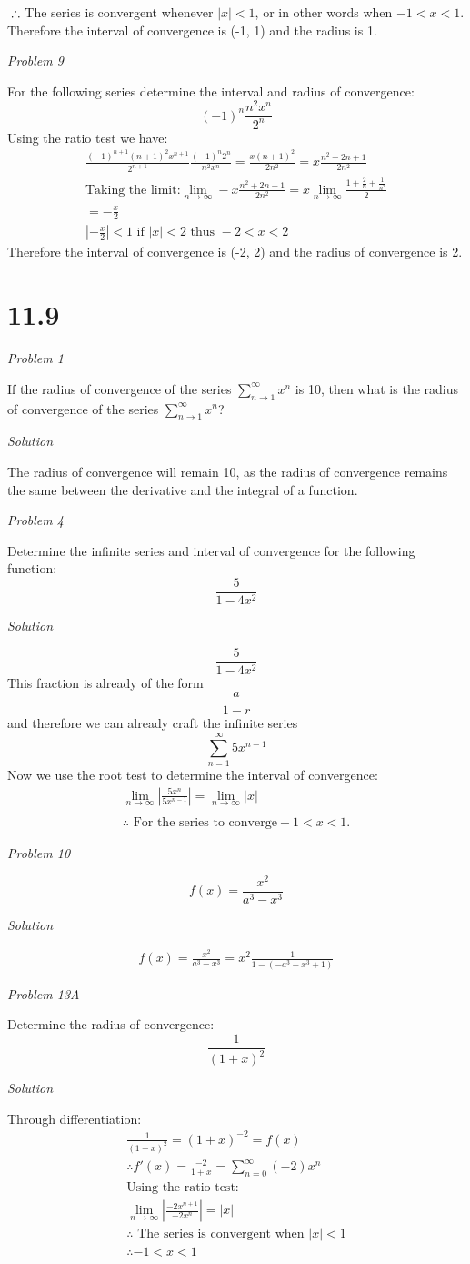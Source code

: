 \documentclass{article}
\newcommand{\qst}[1]{\newpage \begin{center}\textit{Problem #1}\end{center}}
\newcommand{\sol}{\begin{center}\textit{Solution}\end{center}}
\newcommand{\thf}{\\\therefore}
\begin{document}
$\thf$ The series is convergent whenever $|x|<1$, or in other words when $-1<x<1$. Therefore the interval of convergence is (-1, 1) and the radius is 1.
\qst{9}
For the following series determine the interval and radius of convergence:
$$(-1)^n\frac{n^2x^n}{2^n}$$
Using the ratio test we have:
\begin{gather*}
\frac{(-1)^{n+1}(n+1)^2x^{n+1}}{2^{n+1}}\frac{(-1)^n2^n}{n^2x^n}=\frac{x(n+1)^2}{2n^2}=x\frac{n^2+2n+1}{2n^2}
\\\text{Taking the limit:}
\lim_{n\to\infty}-x\frac{n^2+2n+1}{2n^2}=x\lim_{n\to\infty}\frac{1+\frac{2}{n}+\frac{1}{n^2}}{2}
\\=-\frac{x}{2}
\\|-\frac{x}{2}|<1\text{ if } |x|<2 \text{ thus } -2<x<2
\end{gather*}
Therefore the interval of convergence is (-2, 2) and the radius of convergence is 2.
\newpage
\section*{11.9}
\begin{center}\textit{Problem 1}\end{center}
If the radius of convergence of the series $\sum^{\infty}_{n\to 1}x^n$ is 10, then what is the radius of convergence of the series $\sum^{\infty}_{n\to 1}x^n$?
\sol
The radius of convergence will remain 10, as the radius of convergence remains the same between the derivative and the integral of a function.
\qst{4}
Determine the infinite series and interval of convergence for the following function:
$$\frac{5}{1-4x^2}$$
\sol
$$\frac{5}{1-4x^2}$$
This fraction is already of the form $$\frac{a}{1-r}$$ and therefore we can already craft the infinite series $$\sum^{\infty}_{n=1}5x^{n-1}$$
Now we use the root test to determine the interval of convergence:
\begin{gather*}
\lim_{n\to\infty}\left|\frac{5x^{n}}{5x^{n-1}}\right|=\lim_{n\to\infty}|x|
\\\thf \text{ For the series to converge} -1<x<1.
\end{gather*}
\qst{10}
$$f(x)=\frac{x^2}{a^3-x^3}$$
\sol
\begin{gather*}
f(x)=\frac{x^2}{a^3-x^3}=x^2\frac{1}{1-(-a^3-x^3+1)}
\end{gather*}
\qst{13A}
Determine the radius of convergence:
$$\frac{1}{(1+x)^2}$$
\sol
Through differentiation:
\begin{gather*}
\frac{1}{(1+x)^2}=(1+x)^{-2}=f(x)
\thf f'(x)=\frac{-2}{1+x}=\sum^{\infty}_{n=0}(-2)x^n
\\\text{Using the ratio test:}
\\\lim_{n\to\infty}\left|\frac{-2x^{n+1}}{-2x^n}\right|=|x|
\thf \text{ The series is convergent when }|x|<1
\thf -1<x<1
\end{gather*}
\end{document}
